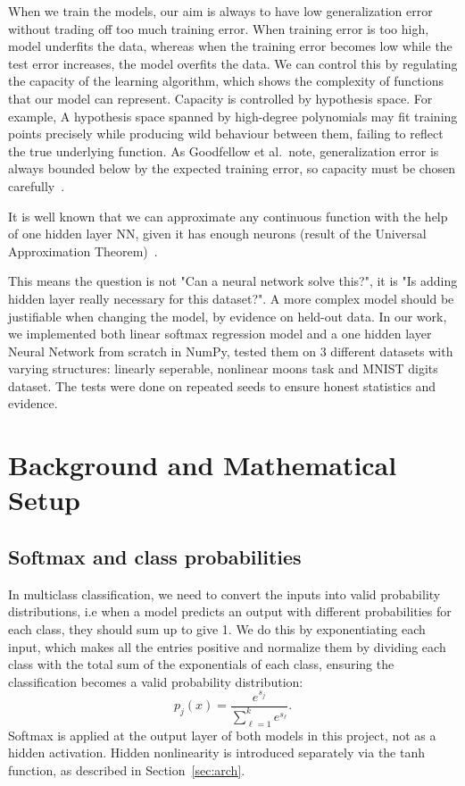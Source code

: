 \documentclass[11pt]{article}
\begin{document}
When we train the models, our aim is always to have low generalization error without trading off too much training error. When training error is too high, model underfits the data, whereas when the training error becomes low while the test error increases, the model overfits the data. We can control this by regulating the capacity of the learning algorithm, which shows the complexity of functions that our model can represent. Capacity is controlled by hypothesis space. For example, A hypothesis space spanned by high-degree polynomials may fit training points
precisely while producing wild behaviour between them, failing to reflect the true
underlying function. As Goodfellow et al.\ note, generalization error is always bounded
below by the expected training error, so capacity must be chosen carefully~\cite{goodfellow}.

It is well known that we can approximate any continuous function with the help of one hidden layer NN, given it has enough neurons (result of the Universal Approximation Theorem)~\cite{cs231n_nn1}. 

This means the question is not "Can a neural network solve this?", it is "Is adding hidden layer really necessary for this dataset?". A more complex model should be justifiable when changing the model, by evidence on held-out data. In our work, we implemented both linear softmax regression model and a one hidden layer Neural Network from scratch in NumPy, tested them on 3 different datasets with varying structures: linearly seperable, nonlinear moons task and MNIST digits dataset. The tests were done on repeated seeds to ensure honest statistics and evidence. 

\section{Background and Mathematical Setup}

\subsection{Softmax and class probabilities}

In multiclass classification, we need to convert the inputs into valid probability distributions, i.e when a model predicts an output with different probabilities for each class, they should sum up to give 1. We do this by exponentiating each input, which makes all the entries positive and normalize them by dividing each class with the total sum of the exponentials of each class, ensuring the classification becomes a valid probability distribution:
\begin{equation}
    p_j(x) = \frac{e^{s_j}}{\sum_{\ell=1}^{k} e^{s_\ell}}.
\end{equation}
Softmax is applied at the output layer of both models in this project, not as a hidden
activation. Hidden nonlinearity is introduced separately via the tanh function, as
described in Section~\ref{sec:arch}.
\end{document}
